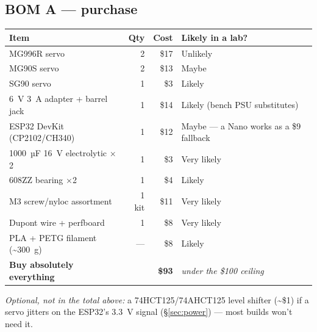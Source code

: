 \documentclass[11pt]{article}
\newcommand{\micro}{\ifmmode\text{µ}\else µ\fi}
\begin{document}
\subsection{BOM A --- purchase}
\begin{center}
\small
\begin{tabular}{L{6.4cm}rrL{4.4cm}}
\toprule
\textbf{Item} & \textbf{Qty} & \textbf{Cost} & \textbf{Likely in a lab?} \\
\midrule
MG996R servo & 2 & \$17 & Unlikely \\
MG90S servo & 2 & \$13 & Maybe \\
SG90 servo & 1 & \$3 & Likely \\
6~V 3~A adapter + barrel jack & 1 & \$14 & Likely (bench PSU substitutes) \\
ESP32 DevKit (CP2102/CH340) & 1 & \$12 & Maybe --- a Nano works as a \$9 fallback \\
1000~\micro F 16~V electrolytic $\times$2 & 1 & \$3 & Very likely \\
608ZZ bearing $\times$2 & 1 & \$4 & Likely \\
M3 screw/nyloc assortment & 1 kit & \$11 & Very likely \\
Dupont wire + perfboard & 1 & \$8 & Very likely \\
PLA + PETG filament (\textasciitilde300~g) & --- & \$8 & Likely \\
\midrule
\textbf{Buy absolutely everything} & & \textbf{\$93} & \emph{under the \$100 ceiling} \\
\bottomrule
\end{tabular}
\end{center}

\emph{Optional, not in the total above:} a 74HCT125/74AHCT125 level shifter (\textasciitilde\$1) if a servo jitters on the ESP32's 3.3~V signal (\S\ref{sec:power}) --- most builds won't need it.
\end{document}

